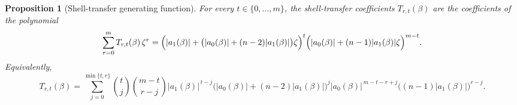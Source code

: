 \documentclass[a4paper,onecolumn,11pt,unpublished]{quantumarticle}
\newtheorem{proposition}[theorem]{Proposition}
\theoremstyle{remark}
\begin{document}
\begin{proposition}[Shell-transfer generating function]
\label{prop:shell-transfer-generating}
For every \(t\in\{0,\dots,m\}\), the shell-transfer coefficients
\(T_{r,t}(\beta)\) are the coefficients of the polynomial
\begin{equation}
\label{eq:shell-transfer-gf-general}
\sum_{r=0}^{m} T_{r,t}(\beta)\,\zeta^r
=
\Bigl(|a_1(\beta)| + \bigl(|a_0(\beta)|+(n-2)|a_1(\beta)|\bigr)\zeta\Bigr)^t
\Bigl(|a_0(\beta)| + (n-1)|a_1(\beta)|\zeta\Bigr)^{m-t}.
\end{equation}
Equivalently,
\begin{equation}
\label{eq:shell-transfer-explicit-general}
T_{r,t}(\beta)
=
\sum_{j=0}^{\min\{t,r\}}
\binom{t}{j}
\binom{m-t}{r-j}
|a_1(\beta)|^{\,t-j}
\bigl(|a_0(\beta)|+(n-2)|a_1(\beta)|\bigr)^j
|a_0(\beta)|^{\,m-t-r+j}
\bigl((n-1)|a_1(\beta)|\bigr)^{r-j}.
\end{equation}
\end{proposition}
\end{document}
